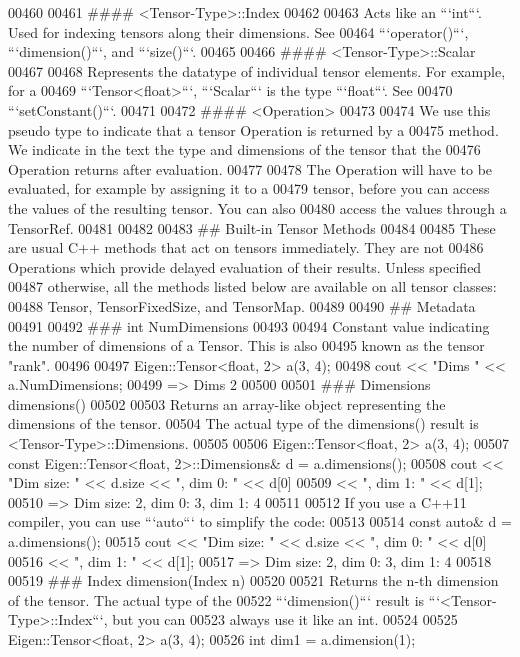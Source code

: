 \begin{DoxyCode}
00460 
00461 #### <Tensor-Type>::Index
00462 
00463 Acts like an ```int```.  Used for indexing tensors along their dimensions.  See
00464 ```operator()```, ```dimension()```, and ```size()```.
00465 
00466 #### <Tensor-Type>::Scalar
00467 
00468 Represents the datatype of individual tensor elements.  For example, for a
00469 ```Tensor<float>```, ```Scalar``` is the type ```float```.  See
00470 ```setConstant()```.
00471 
00472 #### <Operation>
00473 
00474 We use this pseudo type to indicate that a tensor Operation is returned by a
00475 method.  We indicate in the text the type and dimensions of the tensor that the
00476 Operation returns after evaluation.
00477 
00478 The Operation will have to be evaluated, for example by assigning it to a
00479 tensor, before you can access the values of the resulting tensor.  You can also
00480 access the values through a TensorRef.
00481 
00482 
00483 ## Built-in Tensor Methods
00484 
00485 These are usual C++ methods that act on tensors immediately.  They are not
00486 Operations which provide delayed evaluation of their results.  Unless specified
00487 otherwise, all the methods listed below are available on all tensor classes:
00488 Tensor, TensorFixedSize, and TensorMap.
00489 
00490 ## Metadata
00491 
00492 ### int NumDimensions
00493 
00494 Constant value indicating the number of dimensions of a Tensor.  This is also
00495 known as the tensor "rank".
00496 
00497       Eigen::Tensor<float, 2> a(3, 4);
00498       cout << "Dims " << a.NumDimensions;
00499       => Dims 2
00500 
00501 ### Dimensions dimensions()
00502 
00503 Returns an array-like object representing the dimensions of the tensor.
00504 The actual type of the dimensions() result is <Tensor-Type>::Dimensions.
00505 
00506     Eigen::Tensor<float, 2> a(3, 4);
00507     const Eigen::Tensor<float, 2>::Dimensions& d = a.dimensions();
00508     cout << "Dim size: " << d.size << ", dim 0: " << d[0]
00509          << ", dim 1: " << d[1];
00510     => Dim size: 2, dim 0: 3, dim 1: 4
00511 
00512 If you use a C++11 compiler, you can use ```auto``` to simplify the code:
00513 
00514     const auto& d = a.dimensions();
00515     cout << "Dim size: " << d.size << ", dim 0: " << d[0]
00516          << ", dim 1: " << d[1];
00517     => Dim size: 2, dim 0: 3, dim 1: 4
00518 
00519 ### Index dimension(Index n)
00520 
00521 Returns the n-th dimension of the tensor.  The actual type of the
00522 ```dimension()``` result is ```<Tensor-Type>::Index```, but you can
00523 always use it like an int.
00524 
00525       Eigen::Tensor<float, 2> a(3, 4);
00526       int dim1 = a.dimension(1);

\end{DoxyCode}
